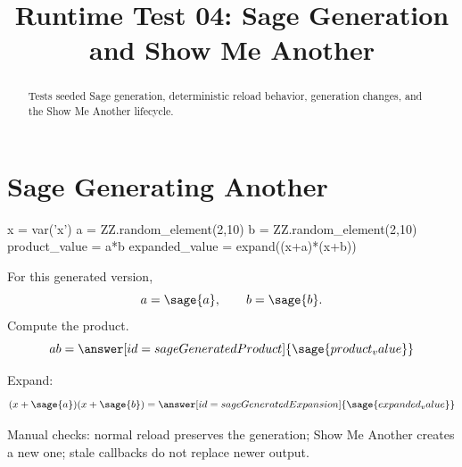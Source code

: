 \documentclass{ximera}
\title{Runtime Test 04: Sage Generation and Show Me Another}
\begin{document}
\begin{abstract}
Tests seeded Sage generation, deterministic reload behavior, generation
changes, and the Show Me Another lifecycle.
\end{abstract}
\maketitle

\section{Sage Generating Another}


\begin{sagesilent}
x = var('x')
a = ZZ.random_element(2,10)
b = ZZ.random_element(2,10)
product_value = a*b
expanded_value = expand((x+a)*(x+b))
\end{sagesilent}

\begin{problem}
For this generated version,
\[
a=\sage{a},\qquad b=\sage{b}.
\]
Compute the product.
\[
ab=\answer[id=sageGeneratedProduct]{\sage{product_value}}
\]
\end{problem}

\begin{problem}
Expand:
\[
(x+\sage{a})(x+\sage{b})
=
\answer[id=sageGeneratedExpansion]{\sage{expanded_value}}
\]
\end{problem}

Manual checks: normal reload preserves the generation; Show Me Another creates
a new one; stale callbacks do not replace newer output.
\end{document}
